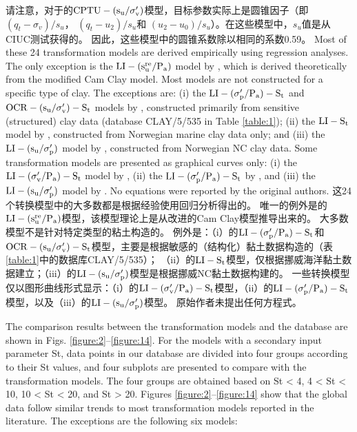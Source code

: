 \begin{Parallel}{0.60\textwidth}{}
{        请注意，对于\citet{Ching201252}的$\rm{CPTU}-(s_u/\sigma_v')$模型，目标参数实际上是圆锥因子（即$(q_t-\sigma_v)/s_u$， $(q_t-u_2)/s_u$和 $(u_2-u_0)/s_u$）。在这些模型中，$s_u$值是从CIUC测试获得的。 因此，这些模型中的圆锥系数除以相同的系数0.59。
    }
    \ParallelPar
    \ParallelLText
    {
        Most of these 24 transformation models are derived empirically using regression analyses. The only exception is the $\rm{LI}-(s_u^{re}/P_a)$ model by \citet{Wroth1978137}, which is derived  theoretically from the modified Cam Clay model. Most models are not constructed for a specific type of clay. The exceptions are: (i) the $\rm{LI}-(\sigma_p'/P_a)-S_t$ and $\rm{OCR}-(s_u/\sigma_v')-S_t$ models by \citet{Ching2012522}, constructed primarily from sensitive (structured) clay data (database CLAY/5/535 in Table \ref{table:1}); (ii) the $\rm{LI}-S_t$ model by \citet{Bjerrum195449}, constructed from Norwegian marine clay data only; and (iii) the $\rm{LI}-(s_u/\sigma_p')$ model by \citet{Bjerrum1960711}, constructed from Norwegian NC clay data. Some transformation models are presented as graphical curves only: (i) the $\rm{LI}-(\sigma_v'/P_a)-S_t$ model by \citet{Mitchell1993}, (ii) the $\rm{LI}-(\sigma_p'/P_a)-S_t$ by \citet{NAVFAC1982}, and (iii) the $\rm{LI}-(s_u/\sigma_p')$ model by \citet{Bjerrum1960711}. No equations were reported by the original authors.
    }
    \ParallelRText
    {
        这24个转换模型中的大多数都是根据经验使用回归分析得出的。 唯一的例外是\citet{Wroth1978137}的$\rm{LI}-(s_u^{re}/P_a)$模型，该模型理论上是从改进的Cam Clay模型推导出来的。 大多数模型不是针对特定类型的粘土构造的。 例外是：（i）\citet{Ching2012522}的$\rm{LI}-(\sigma_p'/P_a)-S_t$和$\rm{OCR}-(s_u/\sigma_v')-S_t$模型，主要是根据敏感的（结构化）黏土数据构造的（表\ref{table:1}中的数据库CLAY/5/535）； （ii）\citet{Bjerrum195449}的$\rm{LI}-S_t$模型，仅根据挪威海洋黏土数据建立；（iii）\citet{Bjerrum1960711}的$\rm{LI}-(s_u/\sigma_p')$模型是根据挪威NC黏土数据构建的。 一些转换模型仅以图形曲线形式显示：（i）\citet{Mitchell1993}的$\rm{LI}-(\sigma_v'/P_a)-S_t$模型，（ii）\citet{NAVFAC1982}的$\rm{LI}-(\sigma_p'/P_a)-S_t$模型，以及（iii）\citet{Bjerrum1960711}的$\rm{LI}-(s_u/\sigma_p')$模型。 原始作者未提出任何方程式。
    }
    \ParallelPar
    \ParallelLText
    {
        The comparison results between the transformation models and the database are shown in Figs. \ref{figure:2}–\ref{figure:14}. For the models with a secondary input parameter St, data points in our database are divided into four groups according to their St values, and four subplots are presented to compare with the transformation models. The four groups are obtained based on St < 4, 4 < St < 10, 10 < St < 20, and St > 20. Figures \ref{figure:2}–\ref{figure:14} show that the global data follow similar trends to most transformation models reported in the literature. The exceptions are the following six models:

}
\end{Parallel}
